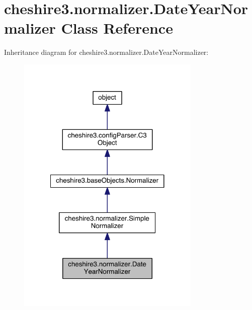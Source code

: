 \hypertarget{classcheshire3_1_1normalizer_1_1_date_year_normalizer}{\section{cheshire3.\-normalizer.\-Date\-Year\-Normalizer Class Reference}
\label{classcheshire3_1_1normalizer_1_1_date_year_normalizer}
}


Inheritance diagram for cheshire3.\-normalizer.\-Date\-Year\-Normalizer\-:
\nopagebreak
\begin{figure}[H]
\begin{center}
\leavevmode
\includegraphics[width=248pt]{classcheshire3_1_1normalizer_1_1_date_year_normalizer__inherit__graph}
\end{center}
\end{figure}


